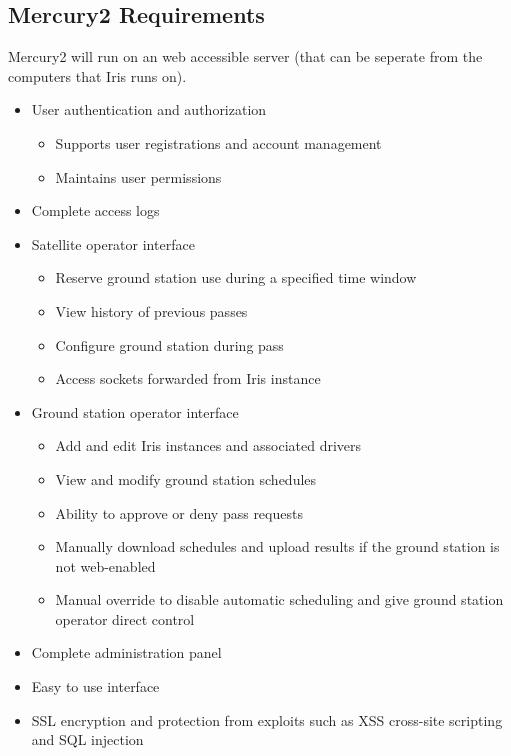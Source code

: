 \documentclass{mxl-note}
\begin{document}
\subsection{Mercury2 Requirements}
Mercury2 will run on an web accessible server (that can be seperate from the computers that Iris runs on).
\begin{itemize}
	\item User authentication and authorization
		\begin{itemize}
			\item Supports user registrations and account management
			\item Maintains user permissions
		\end{itemize}
	\item Complete access logs
	\item Satellite operator interface
		\begin{itemize}
			\item Reserve ground station use during a specified time window
			\item View history of previous passes
			\item Configure ground station during pass
			\item Access sockets forwarded from Iris instance
		\end{itemize}
	\item Ground station operator interface
		\begin{itemize}
			\item Add and edit Iris instances and associated drivers
			\item View and modify ground station schedules
			\item Ability to approve or deny pass requests
			\item Manually download schedules and upload results if the ground station is not web-enabled
			\item Manual override to disable automatic scheduling and give ground station operator direct control
		\end{itemize}
	\item Complete administration panel
	\item Easy to use interface
	\item SSL encryption and protection from exploits such as XSS cross-site scripting and SQL injection 
\end{itemize}
\end{document}
